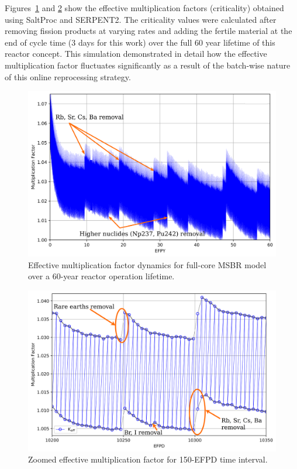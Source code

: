 \documentclass[letterpaper]{article}
\begin{document}
Figures~\ref{fig:keff} and \ref{fig:keff_zoomed} show the effective 
multiplication factors (criticality) obtained using SaltProc and SERPENT2. The 
criticality values were
calculated after removing fission products at varying rates 
and adding the fertile material at the end of
cycle time (3 days for this work) over the full 60 year lifetime of this 
reactor concept. This simulation demonstrated in detail how the effective multiplication
factor fluctuates significantly as a result of the batch-wise nature of this
online reprocessing strategy.

\begin{figure}[ht!]
  \centering
  \includegraphics[width=\textwidth]{keff.png}
  \caption{Effective multiplication factor dynamics for full-core MSBR
  model over a 60-year reactor operation lifetime.}
  \label{fig:keff}
\end{figure}
\begin{figure}[ht!]
  \centering
  \includegraphics[width=\textwidth]{keff_zoomed.png}
  \caption{Zoomed effective multiplication factor for 150-EFPD time interval.}
  \label{fig:keff_zoomed}
\end{figure}
\end{document}
